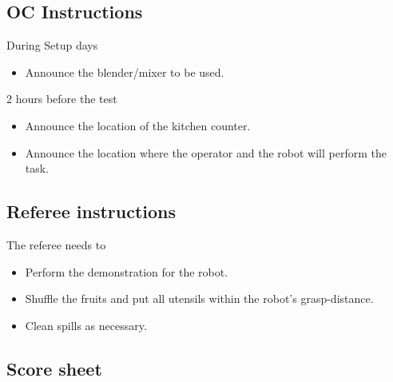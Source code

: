 \subsection*{OC Instructions}
During Setup days
\begin{itemize}[nosep]
	\item Announce the blender/mixer to be used.
\end{itemize}

2 hours before the test
\begin{itemize}[nosep]
	\item Announce the location of the kitchen counter.
	\item Announce the location where the operator and the robot will perform the task.
\end{itemize}

\subsection*{Referee instructions}
The referee needs to
\begin{itemize}[nosep]
	\item Perform the demonstration for the robot.
	\item Shuffle the fruits and put all utensils within the robot's grasp-distance.
	\item Clean spills as necessary.
\end{itemize}


\subsection{Score sheet}

